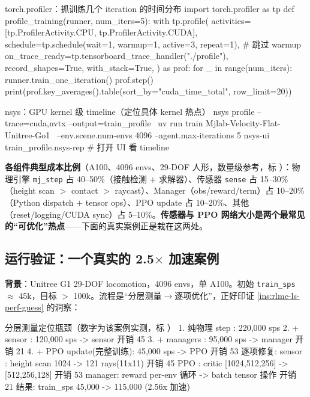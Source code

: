 \begin{codebox}[Python]{torch.profiler：抓训练几个 iteration 的时间分布}
import torch.profiler as tp
def profile_training(runner, num_iters=5):
    with tp.profile(
        activities=[tp.ProfilerActivity.CPU, tp.ProfilerActivity.CUDA],
        schedule=tp.schedule(wait=1, warmup=1, active=3, repeat=1),   # 跳过 warmup
        on_trace_ready=tp.tensorboard_trace_handler("./profile"),
        record_shapes=True, with_stack=True,
    ) as prof:
        for _ in range(num_iters):
            runner.train_one_iteration()
            prof.step()
    print(prof.key_averages().table(sort_by="cuda_time_total", row_limit=20))
\end{codebox}

\begin{codebox}[bash]{nsys：GPU kernel 级 timeline（定位具体 kernel 热点）}
nsys profile --trace=cuda,nvtx --output=train_profile \
    uv run train Mjlab-Velocity-Flat-Unitree-Go1 \
    --env.scene.num-envs 4096 --agent.max-iterations 5
nsys-ui train_profile.nsys-rep        # 打开 UI 看 timeline
\end{codebox}

\textbf{各组件典型成本比例}（A100、4096 envs、29-DOF 人形，数量级参考，标 ）：物理引擎 \verb|mj_step| 占 40--50\%（接触检测 $+$ 求解器）、传感器 \verb|sense| 占 15--30\%（height scan $>$ contact $>$ raycast）、Manager（obs/reward/term）占 10--20\%（Python dispatch $+$ tensor ops）、PPO update 占 10--20\%、其他（reset/logging/CUDA sync）占 5--10\%。\textbf{传感器与 PPO 网络大小是两个最常见的“可优化”热点}——下面的真实案例正是栽在这两处。

\subsection{\texorpdfstring{运行验证：一个真实的 2.5$\times$ 加速案例}{运行验证：一个真实的 2.5x 加速案例}}
\label{sec:rlmc-ls-perf-case}

\textbf{背景}：Unitree G1 29-DOF locomotion，4096 envs，单 A100。初始 \verb|train_sps| $\approx$ 45k，目标 $>$ 100k。流程是“分层测量$\to$逐项优化”，正好印证 \cref{ins:rlmc-ls-perf-guess} 的洞察：

\begin{codebox}[text]{分层测量定位瓶颈（数字为该案例实测，标 \pz{案例值}）}
1. 纯物理 step          : 220,000 sps
2. + sensor             : 120,000 sps   -> sensor 开销 45%
3. + managers           :  95,000 sps   -> manager 开销 21%
4. + PPO update(完整训练):  45,000 sps   -> PPO 开销 53%
逐项修复:
  sensor : height scan 1024 -> 121 rays(11x11)   开销 45%
  PPO    : critic [1024,512,256] -> [512,256,128] 开销 53%
  manager: reward per-env 循环 -> batch tensor 操作 开销 21%
结果: train_sps 45,000 -> 115,000 (2.56x 加速)
\end{codebox}

